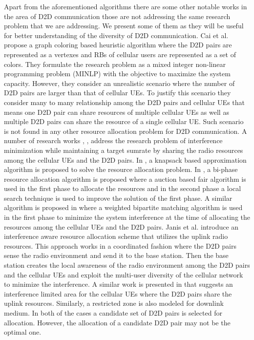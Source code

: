 \documentclass[times]{dacauth}
\begin{document}
\smallskip
\noindent
Apart from the aforementioned algorithms there are some other notable works in the area of D2D communication those are not addressing the same research problem that we are addressing. We present some of them as they will be useful for better understanding of the diversity of D2D communication. Cai et al.\cite{cai} propose a graph coloring based heuristic algorithm where the D2D pairs are represented as a vertexes and RBs of cellular users are represented as a set of colors. They formulate the research problem as a mixed integer non-linear programming problem (MINLP) with the objective to maximize the system capacity. However, they consider an unrealistic scenario where the number of D2D pairs are larger than that of cellular UEs. To justify this scenario they consider many to many relationship among the D2D pairs and cellular UEs that means one D2D pair can share resources of multiple cellular UEs as well as multiple D2D pairs can share the resource of a single cellular UE. Such scenario is not found in any other resource allocation problem for D2D communication. A number of research works \cite{icc}, \cite{islam2016radio}, \cite{islam2015reducing} address the research problem of interference minimization while maintaining a target sumrate by sharing the radio resources among the cellular UEs and the D2D pairs. In \cite{islam2015reducing}, a knapsack based approximation algorithm is proposed to solve the resource allocation problem. In \cite{islam2016radio}, a bi-phase resource allocation algorithm is proposed where a auction based fair algorithm is used in the first phase to allocate the resources and in the second phase a local search technique is used to improve the solution of the first phase. A similar algorithm is proposed in \cite{icc} where a weighted bipartite matching algorithm is used in the first phase to minimize the system interference at the time of allocating the resources among the cellular UEs and the D2D pairs. Janis et al. \cite{janis} introduce an interference aware resource allocation scheme that utilizes the uplink radio resources. This approach works in a coordinated fashion where the D2D pairs sense the radio environment and send it to the base station. Then the base station creates the local awareness of the radio environment among the D2D pairs and the cellular UEs and exploit the multi-user diversity of the cellular network to minimize the interference. A similar work is presented in \cite{min2011capacity} that suggests an interference limited area for the cellular UEs where the D2D pairs share the uplink resources. Similarly, a restricted zone is also modeled for downlink medium. In both of the cases a candidate set of D2D pairs is selected for allocation. However, the allocation of a candidate D2D pair may not be the optimal one. 
\end{document}
